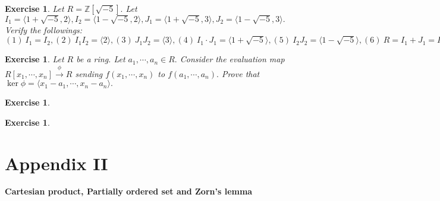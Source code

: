 \documentclass[11pt]{amsart}
\newtheorem{ex}[theorem]{Exercise}
\newcommand{\ZZ}{\mathbb Z}
\newcommand{\gen}[1]{\langle#1\rangle}
\begin{document}
\begin{ex}
Let $R={\ZZ}[\sqrt{-5}].$ Let $I_1=\gen{1+\sqrt{-5},2},I_2=\gen{1-\sqrt{-5},2},J_1=\gen{1+\sqrt{-5},3},J_2=\gen{1-\sqrt{-5},3}.$ Verify the followings:\\
$(1)~ I_1=I_2,(2)~I_1I_2=\gen{2},(3)~J_1J_2=\gen{3},(4)~ I_1\cdot J_1=\gen{1+\sqrt{-5}},(5)~ I_2J_2=\gen{1-\sqrt{-5}},(6)~ R=I_1+J_1=I_1+J_2=J_1+J_2.$
\end{ex}
\begin{ex}
Let $R$ be a ring. Let $a_1,\cdots,a_n\in R.$ Consider the evaluation map $R[x_1,\cdots,x_n]\stackrel{\phi}{\longrightarrow} R$ sending $f(x_1,\cdots,x_n)$ to $f(a_1,\cdots,a_n).$ Prove that $\ker \phi=\gen{x_1-a_1,\cdots ,x_n-a_n}.$
\end{ex}
\begin{ex}

\end{ex}
\begin{ex}

\end{ex}













\newpage
\section{Appendix II}

\begin{center}
\textbf{Cartesian product, Partially ordered set and Zorn's lemma}
\end{center}
\end{document}
